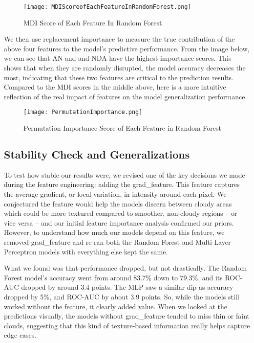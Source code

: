 \documentclass[10pt,letterpaper]{article}
\begin{document}
\begin{figure}[H]
    \centering
    \texttt{[image: MDIScoreofEachFeatureInRandomForest.png]}
    \caption{MDI Score of Each Feature In Random Forest}
    \label{fig:}
\end{figure}
We then use replacement importance to measure the true contribution of the above four features to the model's predictive performance. From the image below, we can see that AN and and NDA have the highest importance scores. This shows that when they are randomly disrupted, the model accuracy decreases the most, indicating that these two features are critical to the prediction results. Compared to the MDI scores in the middle above, here is a more intuitive reflection of the real impact of features on the model generalization performance.
\begin{figure}[H]
    \centering
    \texttt{[image: PermutationImportance.png]}
    \caption{Permutation Importance Score of Each Feature in Random Forest}
    \label{fig:}
\end{figure}

\subsection{Stability Check and Generalizations}

To test how stable our results were, we revised one of the key decisions we made during the feature engineering: adding the grad\_feature. This feature captures the average gradient, or local variation, in intensity around each pixel. We conjectured the feature would help the models discern between cloudy areas which could be more textured compared to smoother, non-cloudy regions -- or vice versa -- and our initial feature importance analysis confirmed our priors. However, to understand how much our models depend on this feature, we removed grad\_feature and re-ran both the Random Forest and Multi-Layer Perceptron models with everything else kept the same.


What we found was that performance dropped, but not drastically. The Random Forest model's accuracy went from around 83.7\% down to 79.3\%, and its ROC-AUC dropped by around 3.4 points. The MLP saw a similar dip as accuracy dropped by 5\%, and ROC-AUC by about 3.9 points. So, while the models still worked without the feature, it clearly added value. When we looked at the predictions visually, the models without grad\_feature tended to miss thin or faint clouds, suggesting that this kind of texture-based information really helps capture edge cases.
\end{document}
